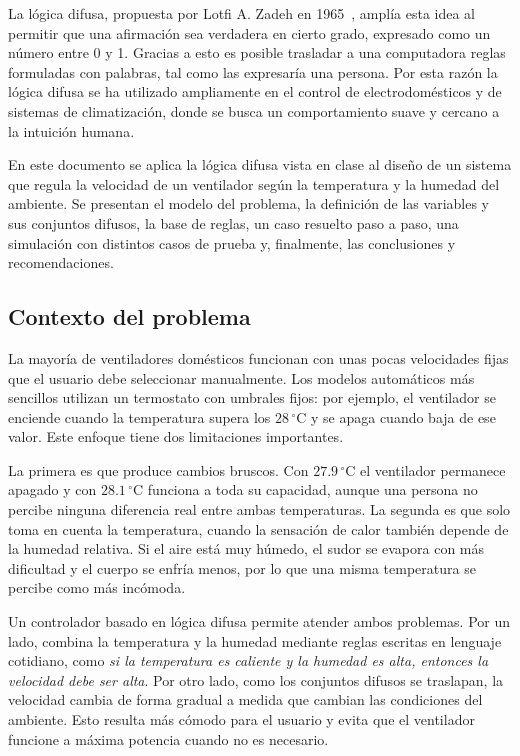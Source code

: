 \documentclass[11pt]{article}
\begin{document}
La lógica difusa, propuesta por Lotfi A. Zadeh en 1965~\cite{zadeh1965}, amplía esta idea al permitir que una afirmación sea verdadera en cierto grado, expresado como un número entre 0 y 1. Gracias a esto es posible trasladar a una computadora reglas formuladas con palabras, tal como las expresaría una persona. Por esta razón la lógica difusa se ha utilizado ampliamente en el control de electrodomésticos y de sistemas de climatización, donde se busca un comportamiento suave y cercano a la intuición humana.

En este documento se aplica la lógica difusa vista en clase al diseño de un sistema que regula la velocidad de un ventilador según la temperatura y la humedad del ambiente. Se presentan el modelo del problema, la definición de las variables y sus conjuntos difusos, la base de reglas, un caso resuelto paso a paso, una simulación con distintos casos de prueba y, finalmente, las conclusiones y recomendaciones.

\subsection{Contexto del problema}

La mayoría de ventiladores domésticos funcionan con unas pocas velocidades fijas que el usuario debe seleccionar manualmente. Los modelos automáticos más sencillos utilizan un termostato con umbrales fijos: por ejemplo, el ventilador se enciende cuando la temperatura supera los $28\,^\circ$C y se apaga cuando baja de ese valor. Este enfoque tiene dos limitaciones importantes.

La primera es que produce cambios bruscos. Con $27.9\,^\circ$C el ventilador permanece apagado y con $28.1\,^\circ$C funciona a toda su capacidad, aunque una persona no percibe ninguna diferencia real entre ambas temperaturas. La segunda es que solo toma en cuenta la temperatura, cuando la sensación de calor también depende de la humedad relativa. Si el aire está muy húmedo, el sudor se evapora con más dificultad y el cuerpo se enfría menos, por lo que una misma temperatura se percibe como más incómoda.

Un controlador basado en lógica difusa permite atender ambos problemas. Por un lado, combina la temperatura y la humedad mediante reglas escritas en lenguaje cotidiano, como \emph{si la temperatura es caliente y la humedad es alta, entonces la velocidad debe ser alta}. Por otro lado, como los conjuntos difusos se traslapan, la velocidad cambia de forma gradual a medida que cambian las condiciones del ambiente. Esto resulta más cómodo para el usuario y evita que el ventilador funcione a máxima potencia cuando no es necesario.
\end{document}
